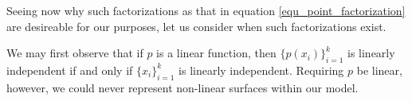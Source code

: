 \documentclass{birkjour}
\theoremstyle{definition}
\theoremstyle{remark}
\numberwithin{equation}{section}
\begin{document}
Seeing now why such factorizations as that in equation \eqref{equ_point_factorization} are desireable for
our purposes, let us consider when such factorizations exist.

We may first observe that if $p$ is a linear function, then $\{p(x_i)\}_{i=1}^k$ is linearly
independent if and only if $\{x_i\}_{i=1}^k$ is linearly independent.
Requiring $p$ be linear, however, we could never represent non-linear surfaces within
our model.


\end{document}
